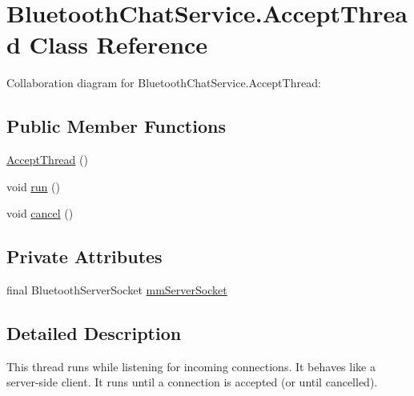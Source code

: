 \hypertarget{classcom_1_1example_1_1android_1_1_bluetooth_chat_1_1_bluetooth_chat_service_1_1_accept_thread}{\section{Bluetooth\-Chat\-Service.\-Accept\-Thread Class Reference}
\label{classcom_1_1example_1_1android_1_1_bluetooth_chat_1_1_bluetooth_chat_service_1_1_accept_thread}
}


Collaboration diagram for Bluetooth\-Chat\-Service.\-Accept\-Thread\-:
\subsection*{Public Member Functions}
\begin{DoxyCompactItemize}
\item 
\hyperlink{classcom_1_1example_1_1android_1_1_bluetooth_chat_1_1_bluetooth_chat_service_1_1_accept_thread_a87e04948833d0fd4826daa3f527b2153}{Accept\-Thread} ()
\item 
void \hyperlink{classcom_1_1example_1_1android_1_1_bluetooth_chat_1_1_bluetooth_chat_service_1_1_accept_thread_a13a43e6d814de94978c515cb084873b1}{run} ()
\item 
void \hyperlink{classcom_1_1example_1_1android_1_1_bluetooth_chat_1_1_bluetooth_chat_service_1_1_accept_thread_a02d5fa6b14e221f3012a794b905be166}{cancel} ()
\end{DoxyCompactItemize}
\subsection*{Private Attributes}
\begin{DoxyCompactItemize}
\item 
final Bluetooth\-Server\-Socket \hyperlink{classcom_1_1example_1_1android_1_1_bluetooth_chat_1_1_bluetooth_chat_service_1_1_accept_thread_a0b04e3279c0cd8ff1bc19ab19c7539d9}{mm\-Server\-Socket}
\end{DoxyCompactItemize}


\subsection{Detailed Description}
This thread runs while listening for incoming connections. It behaves like a server-\/side client. It runs until a connection is accepted (or until cancelled). 

